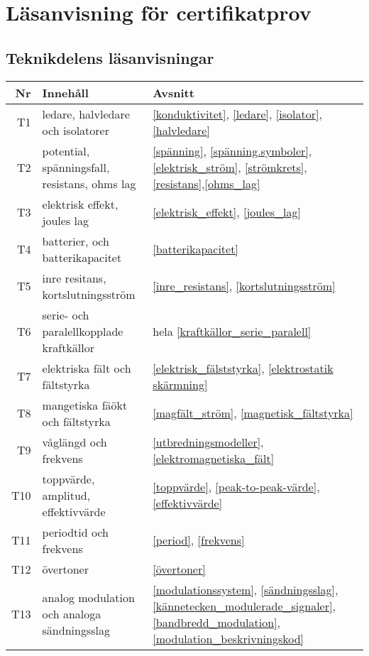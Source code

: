 \onecolumn

\chapter{Läsanvisning för certifikatprov}

\section{Teknikdelens läsanvisningar}


\begin{table}[H]
	\small
\begin{tabular}{rll}
\textbf{Nr} & \textbf{Innehåll} & \textbf{Avsnitt}\\ \hline\hline
T1 & ledare, halvledare och isolatorer & 
\ref{konduktivitet}, \ref{ledare}, \ref{isolator}, \ref{halvledare}\\ \hline
T2 & potential, spänningsfall, resistans, ohms lag &
\ref{spänning}, \ref{spänning.symboler}, \ref{elektrisk_ström}, \ref{strömkrets}, \ref{resistans},\ref{ohms_lag}\\ \hline
T3 & elektrisk effekt, joules lag &
\ref{elektrisk_effekt}, \ref{joules_lag}\\ \hline
T4 & batterier, och batterikapacitet & 
\ref{batterikapacitet}\\ \hline
T5 & inre resitans, kortslutningsström & 
\ref{inre_resistans}, \ref{kortslutningsström}\\ \hline
T6 & serie- och paralellkopplade kraftkällor &
hela \ref{kraftkällor_serie_paralell}\\ \hline
T7 & elektriska fält och fältstyrka &
\ref{elektrisk_fälststyrka}, \ref{elektrostatik skärmning}\\ \hline
T8 & mangetiska fäökt och fältstyrka &
\ref{magfält_ström}, \ref{magnetisk_fältstyrka}\\ \hline
T9 & våglängd och frekvens &
\ref{utbredningsmodeller}, \ref{elektromagnetiska_fält}\\ \hline
T10 & toppvärde, amplitud, effektivvärde &
\ref{toppvärde}, \ref{peak-to-peak-värde}, \ref{effektivvärde}\\ \hline
T11 & periodtid och frekvens&
\ref{period}, \ref{frekvens}\\ \hline
T12 & övertoner &
\ref{övertoner}\\ \hline
T13 & analog modulation och analoga sändningsslag&
\ref{modulationssystem}, \ref{sändningsslag}, \ref{kännetecken_modulerade_signaler}, 
\ref{bandbredd_modulation},  \ref{modulation_beskrivningskod}\\

\end{tabular}
\end{table}
